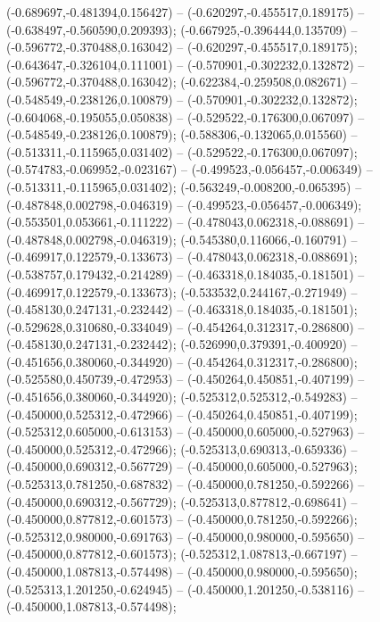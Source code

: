 (-0.689697,-0.481394,0.156427) -- (-0.620297,-0.455517,0.189175) -- (-0.638497,-0.560590,0.209393);
 (-0.667925,-0.396444,0.135709) -- (-0.596772,-0.370488,0.163042) -- (-0.620297,-0.455517,0.189175);
 (-0.643647,-0.326104,0.111001) -- (-0.570901,-0.302232,0.132872) -- (-0.596772,-0.370488,0.163042);
 (-0.622384,-0.259508,0.082671) -- (-0.548549,-0.238126,0.100879) -- (-0.570901,-0.302232,0.132872);
 (-0.604068,-0.195055,0.050838) -- (-0.529522,-0.176300,0.067097) -- (-0.548549,-0.238126,0.100879);
 (-0.588306,-0.132065,0.015560) -- (-0.513311,-0.115965,0.031402) -- (-0.529522,-0.176300,0.067097);
 (-0.574783,-0.069952,-0.023167) -- (-0.499523,-0.056457,-0.006349) -- (-0.513311,-0.115965,0.031402);
 (-0.563249,-0.008200,-0.065395) -- (-0.487848,0.002798,-0.046319) -- (-0.499523,-0.056457,-0.006349);
 (-0.553501,0.053661,-0.111222) -- (-0.478043,0.062318,-0.088691) -- (-0.487848,0.002798,-0.046319);
 (-0.545380,0.116066,-0.160791) -- (-0.469917,0.122579,-0.133673) -- (-0.478043,0.062318,-0.088691);
 (-0.538757,0.179432,-0.214289) -- (-0.463318,0.184035,-0.181501) -- (-0.469917,0.122579,-0.133673);
 (-0.533532,0.244167,-0.271949) -- (-0.458130,0.247131,-0.232442) -- (-0.463318,0.184035,-0.181501);
 (-0.529628,0.310680,-0.334049) -- (-0.454264,0.312317,-0.286800) -- (-0.458130,0.247131,-0.232442);
 (-0.526990,0.379391,-0.400920) -- (-0.451656,0.380060,-0.344920) -- (-0.454264,0.312317,-0.286800);
 (-0.525580,0.450739,-0.472953) -- (-0.450264,0.450851,-0.407199) -- (-0.451656,0.380060,-0.344920);
 (-0.525312,0.525312,-0.549283) -- (-0.450000,0.525312,-0.472966) -- (-0.450264,0.450851,-0.407199);
 (-0.525312,0.605000,-0.613153) -- (-0.450000,0.605000,-0.527963) -- (-0.450000,0.525312,-0.472966);
 (-0.525313,0.690313,-0.659336) -- (-0.450000,0.690312,-0.567729) -- (-0.450000,0.605000,-0.527963);
 (-0.525313,0.781250,-0.687832) -- (-0.450000,0.781250,-0.592266) -- (-0.450000,0.690312,-0.567729);
 (-0.525313,0.877812,-0.698641) -- (-0.450000,0.877812,-0.601573) -- (-0.450000,0.781250,-0.592266);
 (-0.525312,0.980000,-0.691763) -- (-0.450000,0.980000,-0.595650) -- (-0.450000,0.877812,-0.601573);
 (-0.525312,1.087813,-0.667197) -- (-0.450000,1.087813,-0.574498) -- (-0.450000,0.980000,-0.595650);
 (-0.525313,1.201250,-0.624945) -- (-0.450000,1.201250,-0.538116) -- (-0.450000,1.087813,-0.574498);
